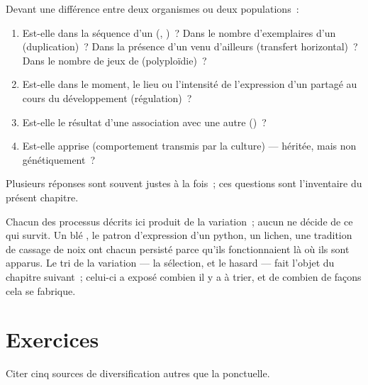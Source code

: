 \begin{method}\label{met:g12:diversification-of-life:name}
Devant une différence entre deux organismes ou deux populations~:
\begin{enumerate}
  \item Est-elle dans la séquence d'un  (, )~? Dans
        le nombre d'exemplaires d'un  (duplication)~? Dans la
        présence d'un  venu d'ailleurs (transfert horizontal)~?
        Dans le nombre de jeux de  (polyploïdie)~?
  \item Est-elle dans le moment, le lieu ou l'intensité de
        l'expression d'un  partagé au cours du développement
        (régulation)~?
  \item Est-elle le résultat d'une association avec une autre 
        ()~?
  \item Est-elle apprise (comportement transmis par la culture) ---
        héritée, mais non génétiquement~?
\end{enumerate}
Plusieurs réponses sont souvent justes à la fois~; ces questions sont
l'inventaire du présent chapitre.
\end{method}

\begin{remark}\label{rem:g12:diversification-of-life:selection}
Chacun des processus décrits ici produit de la variation~; aucun ne
décide de ce qui survit. Un blé , le patron d'expression d'un
python, un lichen, une tradition de cassage de noix ont chacun persisté
parce qu'ils fonctionnaient là où ils sont apparus. Le tri de la
variation --- la sélection, et le hasard --- fait l'objet du chapitre
suivant~; celui-ci a exposé combien il y a à trier, et de combien de
façons cela se fabrique.
\end{remark}

\section{Exercices}

\begin{exercise}[$\star$]\label{exo:g12:diversification-of-life:1}
Citer cinq sources de diversification autres que la  ponctuelle.
\end{exercise}

